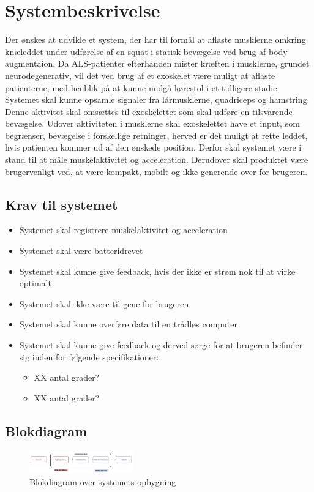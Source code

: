 \section{Systembeskrivelse}
Der ønskes at udvikle et system, der har til formål at aflaste musklerne omkring knæleddet under udførelse af en squat i statisk bevægelse ved brug af body augmentaion. Da ALS-patienter efterhånden mister kræften i musklerne, grundet neurodegenerativ, vil det ved brug af et exoskelet være muligt at aflaste patienterne, med henblik på at kunne undgå kørestol i et tidligere stadie. Systemet skal kunne opsamle signaler fra lårmusklerne, quadriceps og hamstring. Denne aktivitet skal omsættes til exoskelettet som skal udføre en tilsvarende bevægelse. Udover aktiviteten i musklerne skal exoskelettet have et input, som begrænser, bevægelse i forskellige retninger, herved er det muligt at rette leddet, hvis patienten kommer ud af den ønskede position. Derfor skal systemet være i stand til at måle muskelaktivitet og acceleration. Derudover skal produktet være brugervenligt ved, at være kompakt, mobilt og ikke generende over for brugeren.

\subsection{Krav til systemet} 
\begin{itemize}
\item Systemet skal registrere muskelaktivitet og acceleration
\item Systemet skal være batteridrevet
\item Systemet skal kunne give feedback, hvis der ikke er strøm nok til at virke optimalt
\item Systemet skal ikke være til gene for brugeren
\item Systemet skal kunne overføre data til en trådløs computer
\item Systemet skal kunne give feedback og derved sørge for at brugeren befinder sig inden for følgende specifikationer:
\begin{itemize}
\item XX antal grader?
\item XX antal grader?
\end{itemize}
\end{itemize}


\subsection{Blokdiagram}
\begin{figure}[H]
\centering
\includegraphics[width=0.4\textwidth]{figures/blokdiagram.png}
\caption{Blokdiagram over systemets opbygning}
\label{fig:blokdiagram}
\end{figure}

